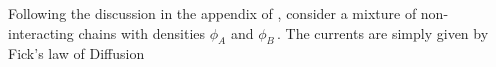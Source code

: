 \documentclass[bachelor,       %
               twoside,        %
               BCOR10mm,       %
                ngerman,english  %
               ]{GAUBM}
\begin{document}












Following the discussion in the appendix of \cite{deGennes80}, consider a mixture of non-interacting chains with densities $\phi_A$ and $\phi_B\,.$ The currents are simply given by Fick's law of Diffusion
\end{document}
